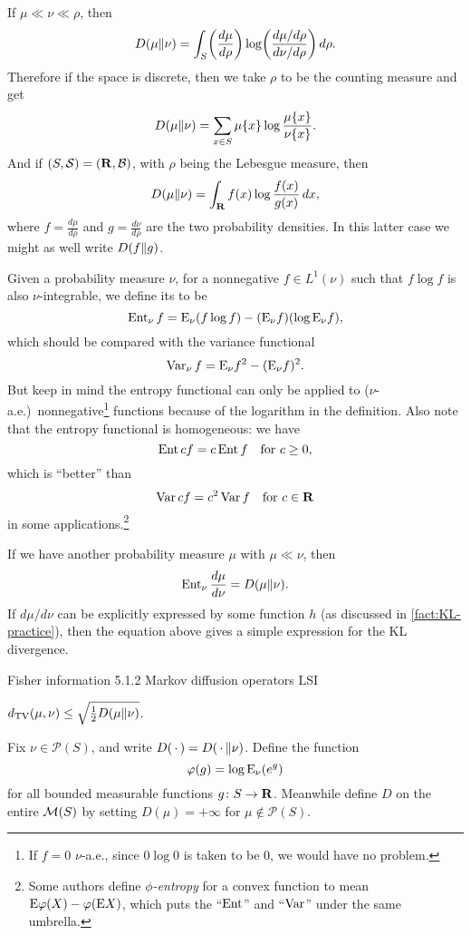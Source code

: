 \begin{fact} \label{fact:KL-practice}
    If $\mu \ll \nu\ll \rho$, then \[
        D(\mu\Vert \nu) = \int_{S} \biggl(\frac{d\mu}{d\rho}\biggr) \log\biggl(\frac{d\mu/d\rho}{d\nu/d\rho}\biggr) \,d\rho.
    \]
    Therefore if the space is discrete, then we take $\rho$ to be the counting measure and get \[
        D(\mu\Vert \nu) = \sum_{x\in S} \mu\{x\} \log\frac{\mu\{x\}}{\nu\{x\}}.
    \]
    And if $(S,\mathcal S) = (\mathbf{R},\mathcal{B})$, with $\rho$ being the Lebesgue measure, then \[
        D(\mu\Vert \nu) = \int_{\mathbf{R}} f(x) \log\frac{f(x)}{g(x)}\,dx,
    \] where $f = \frac{d\mu}{d\rho}$ and $g = \frac{d\nu}{d\rho}$ are the two probability densities. In this latter case we might as well write $D(f\Vert g)$.
\end{fact}

Given a probability measure $\nu$, for a nonnegative $f \in L^1(\nu)$ such that $f \log f$ is also $\nu$-integrable, we define its  to be \[
    \operatorname{Ent}_\nu f = \mathop{}\!\mathrm{E}_\nu (f\log f) - (\mathop{}\!\mathrm{E}_\nu f)(\log \mathop{}\!\mathrm{E}_\nu f),
\] which should be compared with the variance functional \[
    \operatorname{Var}_\nu f = \mathop{}\!\mathrm{E}_\nu f^2 - (\mathop{}\!\mathrm{E}_\nu f)^2.
\] But keep in mind the entropy functional can only be applied to ($\nu$-a.e.)\ nonnegative\footnote{If $f = 0$ $\nu$-a.e., since $0\log 0$ is taken to be $0$, we would have no problem.} functions because of the logarithm in the definition. Also note that the entropy functional is homogeneous: we have \[
    \operatorname{Ent} cf = c\operatorname{Ent} f \quad \text{for } c\geq 0,
\] which is ``better'' than \[
    \operatorname{Var} cf = c^2 \operatorname{Var} f \quad \text{for }c\in \mathbf{R}
\] in some applications.\footnote{Some authors define \emph{$\phi$-entropy} for a convex function to mean $\mathop{}\!\mathrm{E} \varphi(X) - \varphi(\mathop{}\!\mathrm{E} X)$, which puts the ``$\operatorname{Ent}$'' and ``$\operatorname{Var}$'' under the same umbrella.}

If we have another probability measure $\mu$ with $\mu \ll \nu$, then \[
    \operatorname{Ent}_\nu \frac{d\mu}{d\nu} = D(\mu\Vert \nu).
\] If $d\mu/d\nu$ can be explicitly expressed by some function $h$ (as discussed in \cref{fact:KL-practice}), then the equation above gives a simple expression for the KL divergence.

Fisher information 5.1.2 Markov diffusion operators LSI

\begin{namedthm}
    $d_{\mathrm{TV}}(\mu, \nu) \leq \sqrt{\frac 1 2 D(\mu\Vert \nu)}$.
\end{namedthm}

Fix $\nu \in \mathcal P(S)$, and write $D(\,\cdot\,) = D(\,\cdot\,\Vert \nu)$. Define the function \[
    \varphi(g) = \log \mathop{}\!\mathrm{E}_\nu (e^g)
\] for all bounded measurable functions $g\colon S \to \mathbf{R}$. Meanwhile define $D$ on the entire $\mathcal{M}(S)$ by setting $D(\mu) = +\infty$ for $\mu \notin \mathcal P(S)$.

